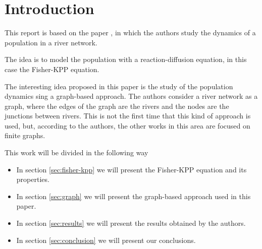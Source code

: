 \section{Introduction}
This report is based on the paper \cite{du2019fisherkpp}, in which the authors study the dynamics of a population in a river network.

The idea is to model the population with a reaction-diffusion equation, in this case the Fisher-KPP equation. 

The interesting idea proposed in this paper is the study of the population dynamics sing a graph-based approach. The authors consider a river network as a graph, where the edges of the graph are the rivers and the nodes are the junctions between rivers. This is not the first time that this kind of approach is used, but, according to the authors, the other works in this area are focused on finite graphs.

This work will be divided in the following way
\begin{itemize}
    \item In section \ref{sec:fisher-kpp} we will present the Fisher-KPP equation and its properties.
    \item In section \ref{sec:graph} we will present the graph-based approach used in this paper.
    \item In section \ref{sec:results} we will present the results obtained by the authors.
    \item In section \ref{sec:conclusion} we will present our conclusions.
\end{itemize}